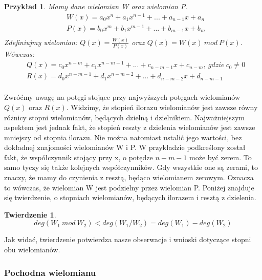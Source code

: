 \documentclass[twoside,a4paper]{book}
\newtheorem{theorem}{Twierdzenie}
\newtheorem{example}{Przykład}
\begin{document}
\begin{example}
	Mamy dane wielomian W oraz wielomian P.
	\begin{equation}
		\begin{split}
			&W(x) = a_0x^n + a_1x^{n-1} + ... + a_{n-1}x + a_n \\
			&P(x) = b_0x^m + b_1x^{m-1} + ... + b_{m-1}x + b_m \\
		\end{split}
	\end{equation}
	Zdefiniujmy wielomian: $Q(x) = \frac{W(x)}{P(x)}$ oraz $Q(x) = W(x)\ mod\ P(x)$. Wówczas:
	\begin{equation}
		\begin{split}
			&Q(x) = c_0x^{n-m} + c_1x^{n-m-1} + ... + c_{n-m-1}x + c_{n-m},\ gdzie\ c_0\ne 0 \\
			&R(x) = d_0x^{n-m-1} + d_1x^{n-m-2} + ... + d_{n-m-2}x + d_{n-m-1} \\
		\end{split}
	\end{equation}
\end{example}

Zwróćmy uwagę na potęgi stojące przy najwyższych potęgach wielomianów $Q(x)$ oraz $R(x)$. Widzimy, że stopień ilorazu wielomianów jest zawsze równy różnicy stopni wielomianów, będących dzielną i dzielnikiem. Najważniejszym aspektem jest jednak fakt, że stopień reszty z dzielenia wielomianów jest zawsze mniejszy od stopnia ilorazu. Nie można natomiast ustalić jego wartości, bez dokładnej znajomości wielomianów W i P. W przykładzie podkreślony został fakt, że współczynnik stojący przy x, o potędze $n-m-1$ może być zerem. To samo tyczy się także kolejnych współczynników. Gdy wszystkie one są zerami, to znaczy, że mamy do czynienia z resztą, będąco wielomianem zerowym. Oznacza to wówczas, że wielomian W jest podzielny przez wielomian P. Poniżej znajduje się twierdzenie, o stopniach wielomianów, będących ilorazem i resztą z dzielenia.

\begin{theorem}
	\begin{equation}
	deg(W_1\ mod\ W_2) < deg(W_1 / W_2) = deg(W_1) - deg(W_2)
	\end{equation}
\end{theorem}

Jak widać, twierdzenie potwierdza nasze obserwacje i wnioski dotyczące stopni obu wielomianów.


\subsubsection{Pochodna wielomianu}
\end{document}
